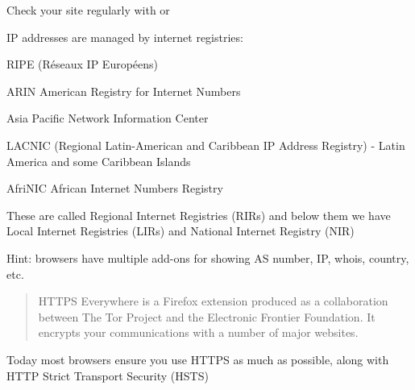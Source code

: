 \documentclass[Screen16to9,17pt]{foils}
\begin{document}
Check your site regularly with  or 


\begin{list1}
\item IP addresses are managed by internet registries:
\begin{list2}
\item RIPE (Réseaux IP Européens)  
\item ARIN American Registry for Internet Numbers 
\item Asia Pacific Network Information Center 
\item LACNIC (Regional Latin-American and Caribbean IP Address
  Registry) - Latin America and some Caribbean Islands
\item AfriNIC African Internet Numbers Registry 
\end{list2}
\item These are called Regional Internet Registries (RIRs) and below them we have Local Internet Registries (LIRs) and National Internet
  Registry (NIR)
\end{list1}

\vskip 1cm
\centerline{Hint: browsers have multiple add-ons for showing AS number, IP, whois, country, etc.}




\begin{quote}
HTTPS Everywhere is a Firefox extension produced as a collaboration between The Tor Project and the Electronic Frontier Foundation. It encrypts your communications with a number of major websites.
\end{quote}

\centerline{}

Today most browsers ensure you use HTTPS as much as possible, along with HTTP Strict Transport Security (HSTS)



\centerline{}


\end{document}
